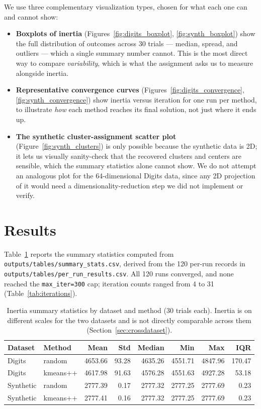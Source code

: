 \documentclass[a4paper,11pt]{article}
\begin{document}
We use three complementary visualization types, chosen for what each one can and cannot
show:

\begin{itemize}[leftmargin=1.4em]
\item \textbf{Boxplots of inertia} (Figures~\ref{fig:digits_boxplot},
\ref{fig:synth_boxplot}) show the full distribution of outcomes across 30 trials --- median,
spread, and outliers --- which a single summary number cannot. This is the most direct way to
compare \emph{variability}, which is what the assignment asks us to measure alongside
inertia.
\item \textbf{Representative convergence curves} (Figures~\ref{fig:digits_convergence},
\ref{fig:synth_convergence}) show inertia versus iteration for one run per method, to
illustrate \emph{how} each method reaches its final solution, not just where it ends up.
\item \textbf{The synthetic cluster-assignment scatter plot} (Figure~\ref{fig:synth_clusters})
is only possible because the synthetic data is 2D; it lets us visually sanity-check that the
recovered clusters and centers are sensible, which the summary statistics alone cannot show.
We do not attempt an analogous plot for the 64-dimensional Digits data, since any 2D
projection of it would need a dimensionality-reduction step we did not implement or verify.
\end{itemize}

\section{Results}
\label{sec:results}

Table~\ref{tab:summary} reports the summary statistics computed from
\texttt{outputs/tables/summary\_stats.csv}, derived from the 120 per-run records in
\texttt{outputs/tables/per\_run\_results.csv}. All 120 runs converged, and none reached the
\texttt{max\_iter=300} cap; iteration counts ranged from 4 to 31 (Table~\ref{tab:iterations}).

\begin{table}[H]
\centering
\caption{Inertia summary statistics by dataset and method (30 trials each). Inertia is on
different scales for the two datasets and is not directly comparable across them
(Section~\ref{sec:crossdataset}).}
\label{tab:summary}
\begin{tabular}{llrrrrrr}
\toprule
Dataset & Method & Mean & Std & Median & Min & Max & IQR \\
\midrule
Digits    & random   & 4653.66 & 93.28 & 4635.26 & 4551.71 & 4847.96 & 170.47 \\
Digits    & kmeans++ & 4617.98 & 91.63 & 4576.28 & 4551.63 & 4927.28 & 53.18 \\
Synthetic & random   & 2777.39 & 0.17  & 2777.32 & 2777.25 & 2777.69 & 0.23 \\
Synthetic & kmeans++ & 2777.41 & 0.16  & 2777.32 & 2777.25 & 2777.69 & 0.23 \\
\bottomrule
\end{tabular}
\end{table}
\end{document}
